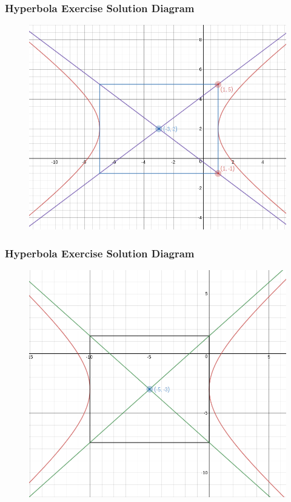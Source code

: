 \documentclass[xcolor=dvipsnames]{beamer}
\begin{document}
\begin{frame}
  \frametitle{Hyperbola Exercise Solution Diagram}
  \begin{figure}[h]
    \includegraphics[scale=.4]{./hyperbola3.png}
  \end{figure}
\end{frame}

\begin{frame}
  \frametitle{Hyperbola Exercise Solution Diagram}
  \begin{figure}[h]
    \includegraphics[scale=.3]{./hyperbola4.png}
  \end{figure}
\end{frame}
\end{document}
